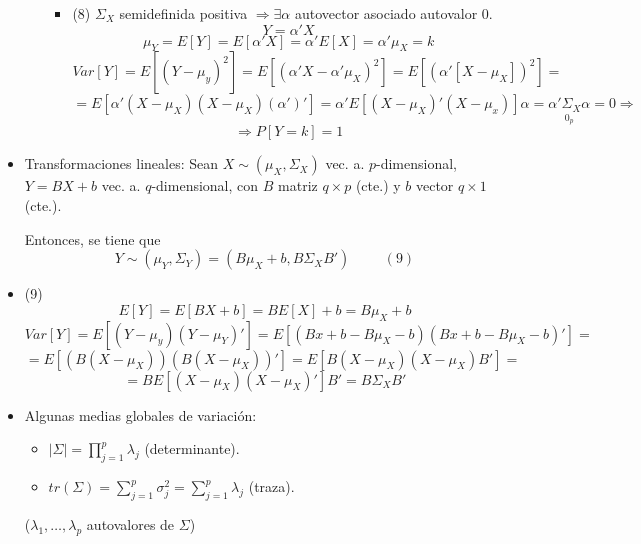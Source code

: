 \documentclass[11pt,a4paper]{article}
\begin{document}
\begin{itemize}
\begin{enumerate}[label=(\Alph*)]
\begin{itemize}
\item (8) $\Sigma_{X}$ semidefinida positiva $\Rightarrow \exists \alpha$ autovector asociado autovalor 0.
$$Y = \alpha'X$$
$$\mu_{Y} = E[Y] = E[\alpha'X] = \alpha' E[X] = \alpha' \mu_{X} = k$$
$$Var[Y] = E[(Y - \mu_{y})^{2}] = E[(\alpha'X - \alpha'\mu_{X})^{2}] = E[(\alpha'[X - \mu_{X}])^{2}] =$$
$$= E[\alpha'(X - \mu_{X})(X - \mu_{X})(\alpha')'] = \alpha' E[(X - \mu_{X})'(X - \mu_{x})] \alpha  = \underset{0_{p}}{\alpha' \Sigma_{X} \alpha} = 0 \Rightarrow$$
$$\Rightarrow P[Y=k] = 1$$
\end{itemize}
\end{enumerate}

\item Transformaciones lineales: Sean $X \sim (\mu_{X}, \Sigma_{X})$ vec. a. $p$-dimensional, $Y = BX + b$ vec. a. $q$-dimensional, con $B$ matriz $q \times p$ (cte.) y $b$ vector $q \times 1$ (cte.).

Entonces, se tiene que
$$Y \sim (\mu_{Y}, \Sigma_{Y}) = (B \mu_{X} + b, B \Sigma_{X} B') \hspace{1cm} (9)$$

\item (9) $$E[Y] = E[BX + b] = BE[X] + b = B\mu_{X} + b$$
$$Var[Y] = E[(Y - \mu_{y})(Y - \mu_{Y})'] = E[(Bx+b - B\mu_{X}-b)(Bx+b - B\mu_{X}-b)'] =$$
$$=E[(B(X - \mu_{X}))(B(X - \mu_{X}))'] = E[B(X - \mu_{X})(X - \mu_{X})B'] =$$
$$= B E[(X - \mu_{X})(X - \mu_{X})']B' = B\Sigma_{X}B'$$

\item Algunas medias globales de variación:
\begin{itemize}
\item $|\Sigma| = \prod_{j=1}^{p} \lambda_{j}$ (determinante).

\item $tr(\Sigma) = \sum_{j=1}^{p} \sigma_{j}^{2} = \sum_{j=1}^{p} \lambda_{j}$ (traza).
\end{itemize}
($\lambda_{1}, \dots, \lambda_{p}$ autovalores de $\Sigma$)
\end{itemize}
\end{document}
